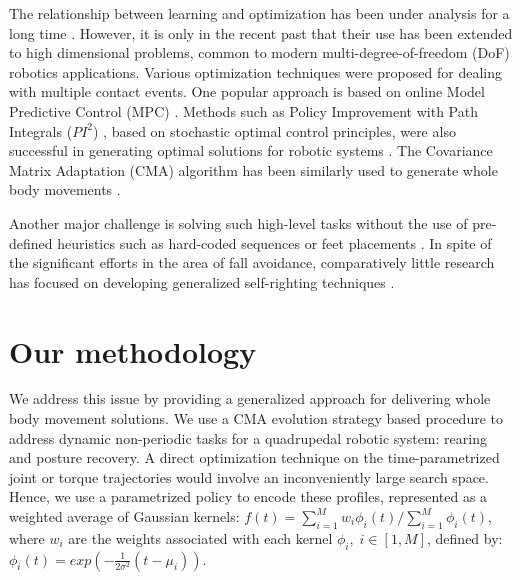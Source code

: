 \documentclass[usletter, 10pt, conference]{ieeeconf}      %
\begin{document}
The relationship between learning and optimization has been under analysis for a long time
\cite{bennett2006interplay,kober2013reinforcement}. However, it is only in the recent past
that their use has been extended to high dimensional problems, common to modern
multi-degree-of-freedom (DoF) robotics applications. 
Various optimization techniques were proposed for dealing with multiple contact events. 
One popular approach is based on online Model Predictive Control (MPC)
\cite{Erez2011,posa_tedrake.IJRR2014}.
Methods such as Policy Improvement with Path Integrals ($PI^2$) \cite{theodorou2010generalized}, 
based on stochastic optimal control principles, were also successful in generating 
optimal solutions for robotic systems \cite{kalakrishnan2011learning, fankhauser2013reinforcement}.
The Covariance Matrix Adaptation (CMA) algorithm \cite{hansen2001completely} 
has been similarly used to generate whole body movements \cite{gehring2016practice}. 

Another major challenge is solving such high-level tasks without the use of 
pre-defined heuristics such as hard-coded sequences or feet 
placements \cite{Winkler2015}. In spite of the significant efforts in the area of fall avoidance, 
comparatively little research has focused
on developing generalized self-righting techniques \cite{ben2008design, kessens2014metric}. 

\section{Our methodology}

We address this issue by providing a generalized approach for 
delivering whole body movement solutions.  
We use a CMA evolution strategy based procedure to address dynamic 
non-periodic tasks for a quadrupedal robotic system: rearing and posture 
recovery. A direct optimization technique on the time-parametrized joint 
or torque trajectories would involve an inconveniently large search 
space. Hence, we use a parametrized policy to encode these profiles, represented as 
a weighted average of Gaussian kernels: $ f(t) = \sum_{i=1}^{M} w_i \phi_i(t)/ \sum_{i=1}^{M} \phi_i(t)$,
\noindent where $w_i$ are the weights associated with each kernel $\phi_i, \; i \in [1, M]$, defined by:
$\phi_i(t) = exp(- \frac{1}{2 \sigma^2} (t-\mu_i))$.
\end{document}
